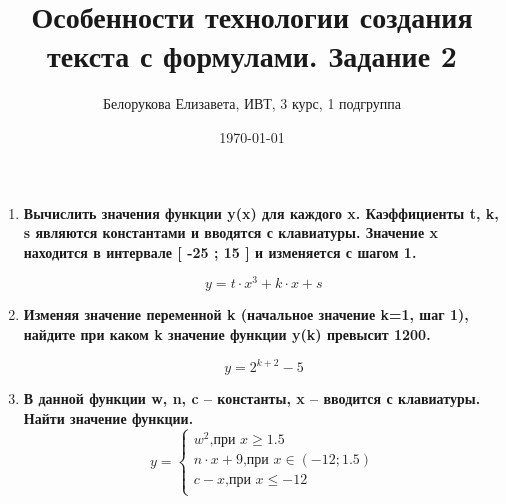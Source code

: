 \documentclass[a4paper,12pt]{article} %
\author{Белорукова Елизавета, ИВТ, 3 курс, 1 подгруппа}
\title{Особенности технологии создания текста с формулами. Задание 2}
\date{\today}
\begin{document}
\maketitle
\newpage

\begin{enumerate}
\item \textbf{Вычислить значения функции y(x) для каждого x. Каэффициенты t, k, s являются константами и вводятся с клавиатуры. Значение x находится в интервале [ -25 ; 15 ] и изменяется с шагом 1.}

\[y = t \cdot x^3 + k \cdot x + s\]

\item \textbf{Изменяя значение переменной k (начальное значение k=1, шаг 1), найдите при каком k значение функции y(k) превысит 1200.}

\[y = 2^{k+2} - 5\]

\item \textbf{В данной функции w, n, c -- константы, x -- вводится с клавиатуры. Найти значение функции.}
\begin{equation*}
y = 
 \begin{cases}
   w^2\text{,при $x \geq 1.5$}\\
   n \cdot x + 9\text{,при $x \in (-12 ; 1.5)$}\\
   c - x\text{,при $x \leq -12$}\\
 \end{cases}
\end{equation*}

\end{enumerate}
\end{document}
